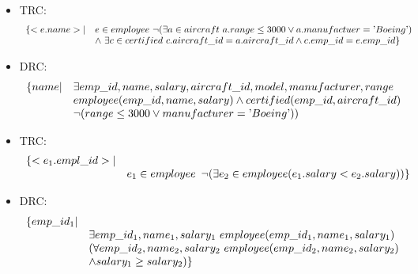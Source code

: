 \begin{exercise}{8}
\begin{subexercise}
  \begin{itemize}
  \item TRC:
    \begin{displaymath}
      \begin{array}{l l}
        \{ < e.name > |   & e\in employee \,\, \neg (\exists a \in aircraft\,\, a.range \leq3000
                            \lor a.manufactuer=\text{'}Boeing\text{'})\\
                          & \land \,\,\exists c \in certified \,\,
                          c.aircraft\_id=a.aircraft\_id \land c.emp\_id =e.emp\_id \}
      \end{array}
    \end{displaymath}
  \item DRC:
    \begin{displaymath}
      \begin{array}{l l}
      \{ name | &\exists emp\_id, name, salary, aircraft\_id, model, manufacturer, range \\
                & employee(emp\_id, name, salary) \land certified(emp\_id, aircraft\_id) \\
                & \neg ( range \leq 3000 \lor manufacturer=\text{'}Boeing\text{'}) )\\
      \end{array}
    \end{displaymath}
  \end{itemize}
\end{subexercise}

\begin{subexercise}
  \begin{itemize}
  \item TRC:
    \begin{displaymath}
      \begin{array}{l l}
        \{ <e_1.empl\_id> | & \\
            & e_1\in employee \,\,\,\neg( \exists e_2 \in employee ( e_1.salary < e_2.salary ) ) \}
      \end{array}
    \end{displaymath}
  \item DRC:
    \begin{displaymath}
      \begin{array}{l l}
        \{ emp\_id_1 | & \\
            & \exists emp\_id_1, name_1, salary_1\,\, employee(emp\_id_1, name_1, salary_1)  \\ 
            & ( \forall emp\_id_2, name_2, salary_2\,\, employee(emp\_id_2, name_2,salary_2) \\
            &\land salary_1 \geq salary_2 ) \}
      \end{array}
    \end{displaymath}
  \end{itemize}
\end{subexercise}

\end{exercise}
